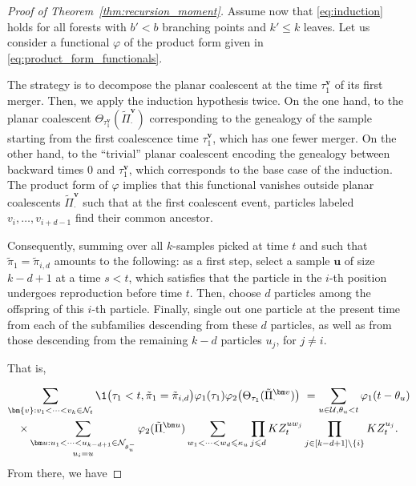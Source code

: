\begin{refsegment}
\begin{proof}[Proof of Theorem~\ref{thm:recursion_moment}]
 
Assume now that \eqref{eq:induction} holds for all forests with $b'<b$ branching points and $k'\leqslant k$ leaves. Let us consider a functional $\varphi$ of the product form given in \eqref{eq:product_form_functionals}. 

The strategy is to decompose the planar coalescent at the time $\tau^{\bm v}_1$ of its first merger. Then, we apply the induction hypothesis twice. On the one hand, to the planar coalescent $\Theta_{\tau^{\bm v}_1}(\tilde\Pi^{\bm v}_{\cdot})$ corresponding to the genealogy of the sample starting from the first coalescence time $\tau^{\bm v}_1$, which has one fewer merger. On the other hand, to the ``trivial'' planar coalescent encoding the genealogy between backward times $0$ and $\tau^{\bm v}_1$, which corresponds to the base case of the induction.\\


The product form of $\varphi$ implies that this functional vanishes outside planar coalescents $\tilde\Pi^{\bm v}_{\cdot}$ such that at the first coalescent event, particles labeled $v_i,\ldots, v_{i+d-1}$ find their common ancestor.

Consequently, summing over all $k$-samples picked at time $t$ and such that $ \tilde\pi_1=\tilde\pi_{i, d}$ amounts to the following: as a first step, select a sample $\bm{u}$ of size $k - d + 1$ at a time $s< t$, which satisfies that the particle in the $i$-th position undergoes reproduction before time $t$. Then, choose $d$ particles among the offspring of this $i$-th particle. Finally, single out one particle at the present time from each of the subfamilies descending from these $d$ particles, as well as from those descending from the remaining $k - d$ particles $u_j$, for $j \neq i$. 

That is,


\begin{multline}\label{eq:combinatorial_identity}
\sum_{\bm{v}:v_1<\cdots< v_k \in  \mathcal{N}_t}\1\big(\tau_1 <t,  \tilde \pi_1=\tilde \pi_{i,d}\big)\varphi_1(\tau_1)\varphi_2\big(\Theta_{\tau_1}(\tilde\Pi^{\bm v}_{\cdot})\big)\ =
 \sum_{u \in \mathcal{U}, \theta_{u}<t}\varphi_1(t-\theta_{u})\\\times \sum_{\substack{\bm u: u_1< \cdots < u_{k-d+1} \in \mathcal{N}_{\theta_{u}^-}\\u_i=u}}\varphi_2(\tilde\Pi^{\bm u}_{\cdot})\sum_{w_1<\cdots<w_d \leqslant \kappa_u} \prod_{j\leqslant d} KZ^{u w_j}_t  \prod_{j\in [k-d+1]\setminus \{i\}} KZ^{u_j}_t .
 \end{multline}
From there, we have



\end{proof}
\end{refsegment}
